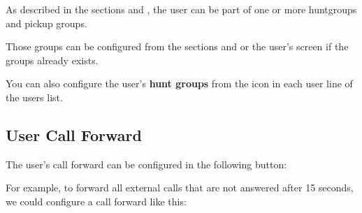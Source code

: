 \documentclass[letterpaper,10pt,english]{sphinxmanual}
\begin{document}
As described in the sections {\hyperref[company/huntgroups:huntgroups]{}} and {\hyperref[company/call_captures:capture\string-groups]{}}, the
user can be part of one or more huntgroups and pickup groups.

Those groups can be configured from the sections {\hyperref[company/huntgroups:huntgroups]{}} and
{\hyperref[company/call_captures:capture\string-groups]{}} or the user's screen if the groups already exists.

You can also configure the user's \textbf{hunt groups} from the icon in each user
line of the users list.



\subsection{User Call Forward}
\label{company/users:user-call-forward}
The user's call forward can be configured in the following button:

\label{company/users:fwd-to-vm}
For example, to forward all external calls that are not answered after 15
seconds, we could configure a call forward like this:

\end{document}
